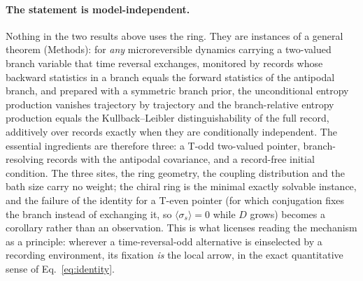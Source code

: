 \documentclass[11pt]{article}
\begin{document}
\paragraph{The statement is model-independent.}
Nothing in the two results above uses the ring. They are instances of a general theorem (Methods): for \emph{any} microreversible dynamics carrying a two-valued branch variable that time reversal exchanges, monitored by records whose backward statistics in a branch equals the forward statistics of the antipodal branch, and prepared with a symmetric branch prior, the unconditional entropy production vanishes trajectory by trajectory and the branch-relative entropy production equals the Kullback--Leibler distinguishability of the full record, additively over records exactly when they are conditionally independent. The essential ingredients are therefore three: a T-odd two-valued pointer, branch-resolving records with the antipodal covariance, and a record-free initial condition. The three sites, the ring geometry, the coupling distribution and the bath size carry no weight; the chiral ring is the minimal exactly solvable instance, and the failure of the identity for a T-even pointer (for which conjugation fixes the branch instead of exchanging it, so $\langle\sigma_s\rangle = 0$ while $D$ grows) becomes a corollary rather than an observation. This is what licenses reading the mechanism as a principle: wherever a time-reversal-odd alternative is einselected by a recording environment, its fixation \emph{is} the local arrow, in the exact quantitative sense of Eq.~\eqref{eq:identity}.
\end{document}
